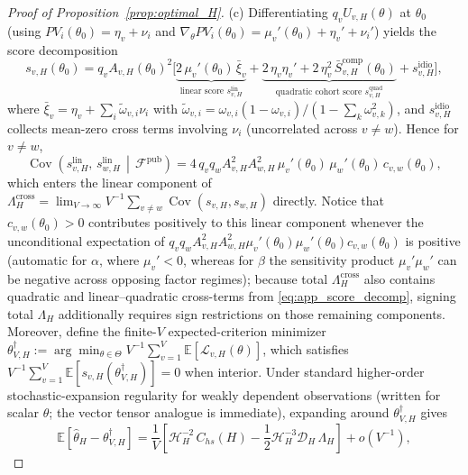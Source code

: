 \begin{proof}[Proof of Proposition~\ref{prop:optimal_H}]
(c) Differentiating $q_v U_{v,H}(\theta)$ at $\theta_0$ (using $PV_i(\theta_0) = \eta_v + \nu_i$ and $\nabla_\theta PV_i(\theta_0) = \mu_v'(\theta_0) + \eta_v' + \nu_i'$) yields the score decomposition
\begin{equation}
\label{eq:app_score_decomp}
s_{v,H}(\theta_0)
= q_v A_{v,H}(\theta_0)^2\Big[\underbrace{2\,\mu_v'(\theta_0)\,\bar\xi_v}_{\text{linear score } s_{v,H}^{\mathrm{lin}}}
+ \underbrace{2\,\eta_v\eta_v' + 2\,\eta_v^2\,\bar{S}_{v,H}^{\mathrm{comp}}(\theta_0)}_{\text{quadratic cohort score } s_{v,H}^{\mathrm{quad}}}
+ s_{v,H}^{\mathrm{idio}}\Big],
\end{equation}
where $\bar\xi_v = \eta_v + \sum_i \tilde\omega_{v,i}\nu_i$ with $\tilde\omega_{v,i} = \omega_{v,i}(1-\omega_{v,i})/(1-\sum_k\omega_{v,k}^2)$, and $s_{v,H}^{\mathrm{idio}}$ collects mean-zero cross terms involving $\nu_i$ (uncorrelated across $v \neq w$).
Hence for $v \neq w$,
\[
\operatorname{Cov}\!\left(s_{v,H}^{\mathrm{lin}},\, s_{w,H}^{\mathrm{lin}} \,\middle|\, \mathcal{F}^{\mathrm{pub}}\right)
= 4\,q_v q_w A_{v,H}^2 A_{w,H}^2\,\mu_v'(\theta_0)\,\mu_w'(\theta_0)\,c_{v,w}(\theta_0),
\]
which enters the linear component of $\Lambda_H^{\mathrm{cross}} = \lim_{V\to\infty} V^{-1}\sum_{v\neq w}\operatorname{Cov}(s_{v,H}, s_{w,H})$ directly. Notice that $c_{v,w}(\theta_0) > 0$ contributes positively to this linear component whenever the unconditional expectation of $q_v q_w A_{v,H}^2 A_{w,H}^2 \mu_v'(\theta_0)\mu_w'(\theta_0)c_{v,w}(\theta_0)$ is positive (automatic for $\alpha$, where $\mu_v' < 0$, whereas for $\beta$ the sensitivity product $\mu_v'\mu_w'$ can be negative across opposing factor regimes); because total $\Lambda_H^{\mathrm{cross}}$ also contains quadratic and linear--quadratic cross-terms from \eqref{eq:app_score_decomp}, signing total $\Lambda_H$ additionally requires sign restrictions on those remaining components.
Moreover, define the finite-$V$ expected-criterion minimizer $\theta_{V,H}^\dagger := \arg\min_{\theta \in \Theta} V^{-1}\sum_{v=1}^V \mathbb{E}[\mathcal{L}_{v,H}(\theta)]$, which satisfies $V^{-1}\sum_{v=1}^V \mathbb{E}[s_{v,H}(\theta_{V,H}^\dagger)] = 0$ when interior. Under standard higher-order stochastic-expansion regularity for weakly dependent observations \citep[cf.][]{rilstone1996second,newey2004higher,bao2007timeseries} (written for scalar $\theta$; the vector tensor analogue is immediate), expanding around $\theta_{V,H}^\dagger$ gives
\[
\mathbb{E}\!\left[\hat\theta_H - \theta_{V,H}^\dagger\right]
= \frac{1}{V}\left[\mathcal{H}_H^{-2}\,C_{hs}(H) - \frac{1}{2}\mathcal{H}_H^{-3}\mathcal{D}_H\,\Lambda_H\right] + o(V^{-1}),
\]
\end{proof}
